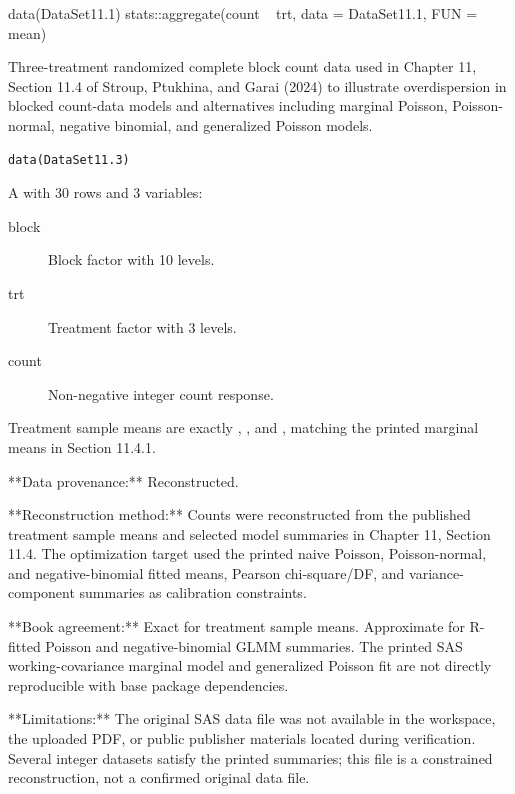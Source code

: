 \documentclass[a4paper]{book}
\begin{document}
%
\begin{SeeAlso}
\end{SeeAlso}
%
\begin{Examples}
\begin{ExampleCode}
data(DataSet11.1)
stats::aggregate(count ~ trt, data = DataSet11.1, FUN = mean)
\end{ExampleCode}
\end{Examples}
%
\begin{Description}
Three-treatment randomized complete block count data used in Chapter 11,
Section 11.4 of Stroup, Ptukhina, and Garai (2024) to illustrate
overdispersion in blocked count-data models and alternatives including
marginal Poisson, Poisson-normal, negative binomial, and generalized
Poisson models.
\end{Description}
%
\begin{Usage}
\begin{verbatim}
data(DataSet11.3)
\end{verbatim}
\end{Usage}
%
\begin{Format}
A  with 30 rows and 3 variables:
\begin{description}

\item[block] Block factor with 10 levels.
\item[trt] Treatment factor with 3 levels.
\item[count] Non-negative integer count response.

\end{description}

\end{Format}
%
\begin{Details}
Treatment sample means are exactly , , and
, matching the printed marginal means in Section 11.4.1.

**Data provenance:** Reconstructed.

**Reconstruction method:** Counts were reconstructed from the published
treatment sample means and selected model summaries in Chapter 11,
Section 11.4. The optimization target used the printed naive Poisson,
Poisson-normal, and negative-binomial fitted means, Pearson chi-square/DF,
and variance-component summaries as calibration constraints.

**Book agreement:** Exact for treatment sample means. Approximate for
R-fitted Poisson and negative-binomial GLMM summaries. The printed SAS
working-covariance marginal model and generalized Poisson fit are not
directly reproducible with base package dependencies.

**Limitations:** The original SAS data file was not available in the
workspace, the uploaded PDF, or public publisher materials located during
verification. Several integer datasets satisfy the printed summaries; this
file is a constrained reconstruction, not a confirmed original data file.
\end{Details}
\end{document}
